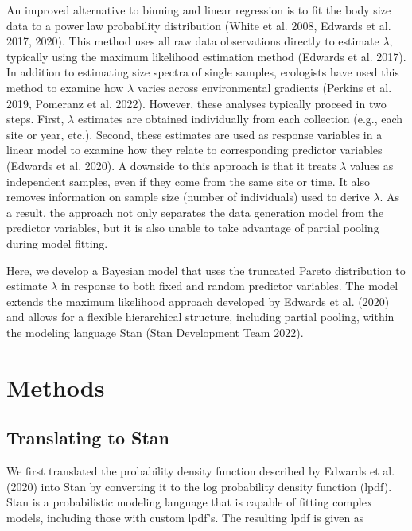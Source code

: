 \documentclass[
  12pt,
]{article}
\numberwithin{equation}
\begin{document}
An improved alternative to binning and linear regression is to fit the
body size data to a power law probability distribution (White et al.
2008, Edwards et al. 2017, 2020). This method uses all raw data
observations directly to estimate \(\lambda\), typically using the
maximum likelihood estimation method (Edwards et al. 2017). In addition
to estimating size spectra of single samples, ecologists have used this
method to examine how \(\lambda\) varies across environmental gradients
(Perkins et al. 2019, Pomeranz et al. 2022). However, these analyses
typically proceed in two steps. First, \(\lambda\) estimates are
obtained individually from each collection (e.g., each site or year,
etc.). Second, these estimates are used as response variables in a
linear model to examine how they relate to corresponding predictor
variables (Edwards et al. 2020). A downside to this approach is that it
treats \(\lambda\) values as independent samples, even if they come from
the same site or time. It also removes information on sample size
(number of individuals) used to derive \(\lambda\). As a result, the
approach not only separates the data generation model from the predictor
variables, but it is also unable to take advantage of partial pooling
during model fitting.

Here, we develop a Bayesian model that uses the truncated Pareto
distribution to estimate \(\lambda\) in response to both fixed and
random predictor variables. The model extends the maximum likelihood
approach developed by Edwards et al. (2020) and allows for a flexible
hierarchical structure, including partial pooling, within the modeling
language Stan (Stan Development Team 2022).

\hypertarget{methods}{%
\section{Methods}\label{methods}}

\hypertarget{translating-to-stan}{%
\subsection{Translating to Stan}\label{translating-to-stan}}

We first translated the probability density function described by
Edwards et al. (2020) into Stan by converting it to the log probability
density function (lpdf). Stan is a probabilistic modeling language that
is capable of fitting complex models, including those with custom
lpdf's. The resulting lpdf is given as
\end{document}
